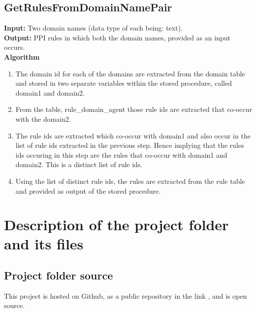 \documentclass[msc,deptreport,ai]{infthesis}      %
\begin{document}
 \subsection{GetRulesFromDomainNamePair}
  \textbf{Input:} Two domain names (data type of each being: text).\\
 \textbf{Output:} PPI rules in which both the domain names, provided as an input occurs.\\ 
 \textbf{Algorithm}
  \begin{enumerate}
 \item  The domain id for each of the domains are extracted from the domain table and stored in two separate variables within the stored procedure, called domain1 and domain2. 
\item  From the table, rule\_domain\_agent those rule ids are extracted that co-occur with the domain2.
\item  The rule ids are extracted which co-occur with domain1 and also occur in the list of rule ids extracted in the previous step. Hence implying that the rules ids occuring in this step are the rules that co-occur with domain1 and domain2. This is a distinct list of rule ids. 
\item Using the list of distinct rule ids, the rules are extracted from the rule table and provided as output of the stored procedure.
 \end{enumerate}
\section{Description of the project folder and its files}
\subsection{Project folder source}
This project is hosted on Github, as a public repository in the link \cite{sourceCode}, and is open source.
\end{document}
